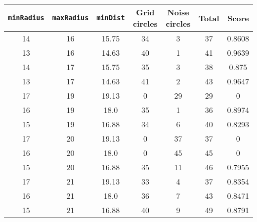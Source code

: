 \documentclass[letterpaper, 12pt]{article}
\begin{document}
\begin{longtable}{|c|c|c|c|c|c|c|}
\hline
\textbf{\texttt{minRadius}} & \textbf{\texttt{maxRadius}} & \textbf{\texttt{minDist}} & \textbf{Grid circles} & \textbf{Noise circles} & \textbf{Total} & \textbf{Score} \\
\hline
14 & 16 & 15.75 & 34 & 3 & 37 & 0.8608 \\
\hline
13 & 16 & 14.63 & 40 & 1 & 41 & 0.9639 \\
\hline
14 & 17 & 15.75 & 35 & 3 & 38 & 0.875 \\
\hline
13 & 17 & 14.63 & 41 & 2 & 43 & 0.9647 \\
\hline
17 & 19 & 19.13 & 0 & 29 & 29 & 0 \\
\hline
16 & 19 & 18.0 & 35 & 1 & 36 & 0.8974 \\
\hline
15 & 19 & 16.88 & 34 & 6 & 40 & 0.8293 \\
\hline
17 & 20 & 19.13 & 0 & 37 & 37 & 0 \\
\hline
16 & 20 & 18.0 & 0 & 45 & 45 & 0 \\
\hline
15 & 20 & 16.88 & 35 & 11 & 46 & 0.7955 \\
\hline
17 & 21 & 19.13 & 33 & 4 & 37 & 0.8354 \\
\hline
16 & 21 & 18.0 & 36 & 7 & 43 & 0.8471 \\
\hline
15 & 21 & 16.88 & 40 & 9 & 49 & 0.8791 \\
\hline
\end{longtable}
\end{document}
